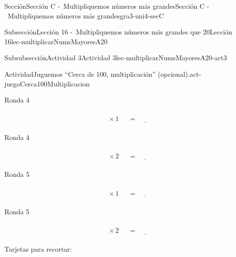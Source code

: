 \begin{sectionptx}{Sección}{Sección C -~Multipliquemos números más grandes}{}{Sección C -~Multipliquemos números más grandes}{}{}{gra3-uni4-secC}
\begin{subsectionptx}{Subsección}{Lección 16 -~Multipliquemos números más grandes que 20}{}{Lección 16}{}{}{lec-multiplicarNumsMayoresA20}
\begin{subsubsectionptx}{Subsubsección}{Actividad 3}{}{Actividad 3}{}{}{lec-multiplicarNumsMayoresA20-act3}
\begin{activity}{Actividad}{Juguemos “Cerca de 100, multiplicación” (opcional).}{act-juegoCerca100Multiplicacion}
\begin{sidebyside}{2}{0}{0}{0.1}
\begin{sbspanel}{0.45}
Ronda 4%
\par
%
\begin{equation*}
\boxed{\phantom{\frac{00}{00}}} \times 1 \ \boxed{\phantom{\frac{00}{00}}}= \underline{\hspace{1cm}}
\end{equation*}
%
\end{sbspanel}%
\begin{sbspanel}{0.45}%
Ronda 4%
\par
%
\begin{equation*}
\boxed{\phantom{\frac{00}{00}}} \times 2 \ \boxed{\phantom{\frac{00}{00}}}= \underline{\hspace{1cm}}
\end{equation*}
%
\end{sbspanel}%
\end{sidebyside}%
\begin{sidebyside}{2}{0}{0}{0.1}%
\begin{sbspanel}{0.45}%
Ronda 5%
\par
%
\begin{equation*}
\boxed{\phantom{\frac{00}{00}}} \times 1 \ \boxed{\phantom{\frac{00}{00}}}= \underline{\hspace{1cm}}
\end{equation*}
%
\end{sbspanel}%
\begin{sbspanel}{0.45}%
Ronda 5%
\par
%
\begin{equation*}
\boxed{\phantom{\frac{00}{00}}} \times 2 \ \boxed{\phantom{\frac{00}{00}}}= \underline{\hspace{1cm}}
\end{equation*}
%
\end{sbspanel}%
\end{sidebyside}%
%
\end{activity}%
\begin{cutoutpage}
Tarjetas para recortar:
\begin{image}{0}{1}{0}{}%

\end{image}
\end{cutoutpage}
\end{subsubsectionptx}
\end{subsectionptx}
\end{sectionptx}
